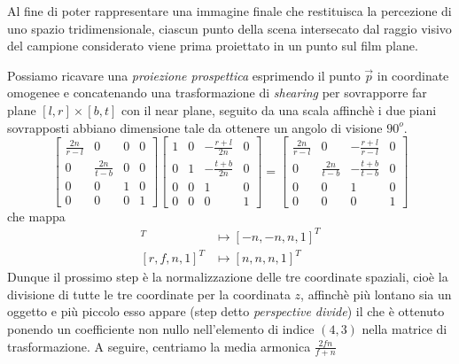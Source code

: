 Al fine di poter rappresentare una immagine finale che restituisca la percezione di uno spazio tridimensionale, ciascun punto della scena intersecato
dal raggio visivo del campione considerato viene prima proiettato in un punto sul film plane.\par 
Possiamo ricavare una \textit{proiezione prospettica}\footnotemark{} esprimendo il punto $\vec{p}$ in coordinate omogenee 
e concatenando una trasformazione di 
\textit{shearing}\footnotemark{} per sovrapporre far plane $[l,r]\times [b,t]$ con il near plane, seguito da una scala affinch\`e i due piani 
sovrapposti abbiano dimensione tale da ottenere un angolo di visione $90^o$.
\begin{equation}\label{chapter2:camera:fromFrustum2nbynquad}
	\begin{bmatrix}
		\frac{2n}{r-l} & 0 & 0 & 0 \\ 0 & \frac{2n}{t-b} & 0 & 0 \\ 0 & 0 & 1 & 0 \\ 0 & 0 & 0 & 1
	\end{bmatrix}
	\begin{bmatrix}
		1 & 0 & -\frac{r+l}{2n} & 0 \\ 0 & 1 & -\frac{t+b}{2n} & 0 \\ 0 & 0 & 1 & 0 \\ 0 & 0 & 0 & 1
	\end{bmatrix}
	=
	\begin{bmatrix}
		\frac{2n}{r-l} & 0 & -\frac{r+l}{r-l} & 0 \\ 0 & \frac{2n}{t-b} & -\frac{t+b}{t-b} & 0 \\ 0 & 0 & 1 & 0 \\ 0 & 0 & 0 & 1
	\end{bmatrix}
\end{equation}
che mappa 
\begin{align*}
	[l, b, n, 1]^T &\mapsto [-n,-n, n, 1]^T \\
	[r, f, n, 1]^T &\mapsto [n, n, n, 1]^T
\end{align*}
Dunque il prossimo step \`e la normalizzazione delle tre coordinate spaziali, cio\`e la divisione di tutte le tre coordinate per la coordinata $z$,
affinch\`e pi\`u lontano sia un oggetto e pi\`u piccolo esso appare (step detto \textit{perspective divide}) il che \`e ottenuto ponendo un 
coefficiente non nullo nell'elemento di indice $(4,3)$ nella matrice di trasformazione. A seguire, centriamo la media armonica $\frac{2fn}{f+n}$
